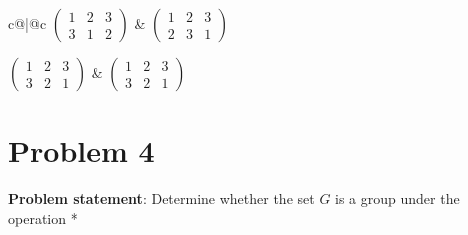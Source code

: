 \documentclass{article} %
\begin{document}
\begin{addmargin}[1em]{0em}
\begin{tabular}{c@\quad |@\quad c}
$\left( \begin{matrix} 1 & 2 & 3 \\ 3 & 1 & 2 \end{matrix} \right)$ & $\left( \begin{matrix} 1 & 2 & 3 \\ 2 & 3 & 1 \end{matrix} \right)$ \\ \rule{0pt}{5ex}
$\left( \begin{matrix} 1 & 2 & 3 \\ 3 & 2 & 1 \end{matrix} \right)$ & $\left( \begin{matrix} 1 & 2 & 3 \\ 3 & 2 & 1 \end{matrix} \right)$ 
\end{tabular}
\end{addmargin}    

\newpage

\section*{Problem 4}

\textbf{Problem statement}: Determine whether the set $G$ is a group under the operation *
\\
\end{document}
